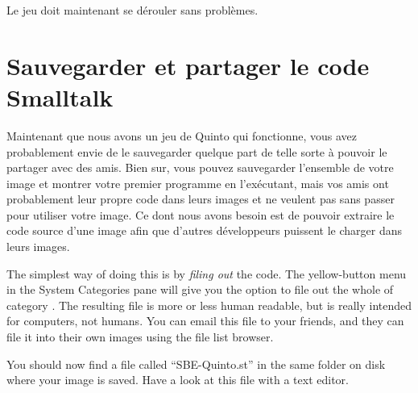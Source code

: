 \documentclass[a4paper,10pt,twoside]{book}
\begin{document}
Le jeu doit maintenant se dérouler sans problèmes.


\section{Sauvegarder et partager le code Smalltalk}
\label{sec:Monticello}

Maintenant que nous avons un jeu de Quinto qui fonctionne, vous avez probablement envie de le sauvegarder quelque part de telle sorte à pouvoir le partager avec des amis. Bien sur, vous pouvez sauvegarder l'ensemble de votre image \squeak et montrer votre premier programme en l'exécutant, mais vos amis ont probablement leur propre code dans leurs images et ne veulent pas sans passer pour utiliser votre image.
Ce dont nous avons besoin est de pouvoir extraire le code source d'une image \squeak afin que d'autres développeurs puissent le charger dans leurs images.

The simplest way of doing this is by \emph{filing out} the code.  The yellow-button menu in the System Categories pane will give you the option to file out the whole of category .
The resulting file is more or less human readable, but is really intended for computers, not humans.
You can email this file to your friends, and they can file it into their own \squeak images using the file list browser.

You should now find a file called ``SBE-Quinto.st'' in the same folder on disk where your image is saved.
Have a look at this file with a text editor.

\end{document}
